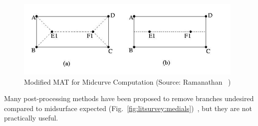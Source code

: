 	\begin{figure} [h]
		\centering
		\includegraphics[width=0.7\linewidth]{images/midcurve}
		\caption{Modified MAT for Midcurve Computation (Source: Ramanathan~\cite{Ramanathan2004} )}
		\label{fig:litsurvey:midcurve}
	\end{figure}
	
Many post-processing methods have been proposed to remove branches undesired compared to midsurface expected (Fig.~\ref{fig:litsurvey:medials})~\cite{Attali2004,  Tam2003, Algazi1992,Brandt1992, Ogniewicz1995, Tam2002, Turkiyyah1995,Turkiyyah1997, KaoJune1999}, but they are not practically useful.






